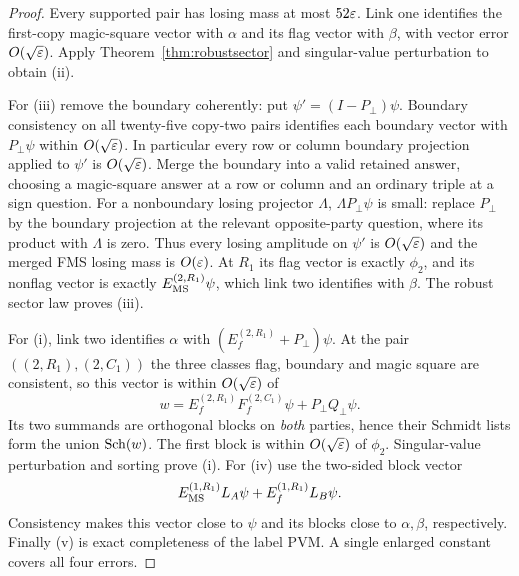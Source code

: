 \begin{proof}
Every supported pair has losing mass at most $52\varepsilon$.
Link one identifies the first-copy magic-square vector with $\alpha$
and its flag vector with $\beta$, with vector error $O(\sqrt{\varepsilon})$.
Apply Theorem~\ref{thm:robustsector} and singular-value perturbation
to obtain (ii).

For (iii) remove the boundary coherently: put
$\psi'=(I-P_\bot)\psi$. Boundary consistency on all twenty-five
copy-two pairs identifies each boundary vector with $P_\bot\psi$
within $O(\sqrt{\varepsilon})$. In particular every row or column boundary
projection applied to $\psi'$ is $O(\sqrt{\varepsilon})$.
Merge the boundary into a valid retained answer, choosing a magic-square
answer at a row or column and an ordinary triple at a sign question.
For a nonboundary losing projector $\Lambda$,
$\Lambda P_\bot\psi$ is small: replace $P_\bot$ by the boundary
projection at the relevant opposite-party question, where its product
with $\Lambda$ is zero. Thus every losing amplitude on $\psi'$ is
$O(\sqrt{\varepsilon})$ and the merged FMS losing mass is $O(\varepsilon)$.
At $R_1$ its flag vector is exactly $\phi_2$, and its nonflag vector is
exactly $E_{\rm MS}^{(2,R_1)}\psi$, which link two identifies with
$\beta$. The robust sector law proves (iii).

For (i), link two identifies $\alpha$ with
$(E_f^{(2,R_1)}+P_\bot)\psi$. At the pair $((2,R_1),(2,C_1))$ the
three classes flag, boundary and magic square are consistent, so this
vector is within $O(\sqrt{\varepsilon})$ of
\[
w=E_f^{(2,R_1)}F_f^{(2,C_1)}\psi+P_\bot Q_\bot\psi.
\]
Its two summands are orthogonal blocks on \emph{both} parties, hence
their Schmidt lists form the union $\operatorname{Sch}(w)$. The first block is
within $O(\sqrt{\varepsilon})$ of $\phi_2$. Singular-value perturbation and
sorting prove (i). For (iv) use the two-sided block vector
\[
E_{\rm MS}^{(1,R_1)}L_A\psi+E_f^{(1,R_1)}L_B\psi.
\]
Consistency makes this vector close to $\psi$ and its blocks close to
$\alpha,\beta$, respectively. Finally (v) is exact completeness of
the label PVM. A single enlarged constant covers all four errors.
\end{proof}

